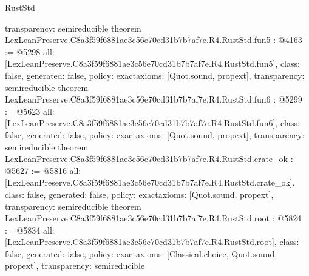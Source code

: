 \begin{lexlean}{RustStd}
\begin{coremodule}
{  transparency: semireducible
}
theorem LexLeanPreserve.C8a3f59f6881ae3c56e70cd31b7b7af7e.R4.RustStd.fun5 : @4163 := @5298 {
  all: [LexLeanPreserve.C8a3f59f6881ae3c56e70cd31b7b7af7e.R4.RustStd.fun5],
  class: false,
  generated: false,
  policy: exact{axioms: [Quot.sound, propext]},
  transparency: semireducible
}
theorem LexLeanPreserve.C8a3f59f6881ae3c56e70cd31b7b7af7e.R4.RustStd.fun6 : @5299 := @5623 {
  all: [LexLeanPreserve.C8a3f59f6881ae3c56e70cd31b7b7af7e.R4.RustStd.fun6],
  class: false,
  generated: false,
  policy: exact{axioms: [Quot.sound, propext]},
  transparency: semireducible
}
theorem LexLeanPreserve.C8a3f59f6881ae3c56e70cd31b7b7af7e.R4.RustStd.crate_ok : @5627 := @5816 {
  all: [LexLeanPreserve.C8a3f59f6881ae3c56e70cd31b7b7af7e.R4.RustStd.crate_ok],
  class: false,
  generated: false,
  policy: exact{axioms: [Quot.sound, propext]},
  transparency: semireducible
}
theorem LexLeanPreserve.C8a3f59f6881ae3c56e70cd31b7b7af7e.R4.RustStd.root : @5824 := @5834 {
  all: [LexLeanPreserve.C8a3f59f6881ae3c56e70cd31b7b7af7e.R4.RustStd.root],
  class: false,
  generated: false,
  policy: exact{axioms: [Classical.choice, Quot.sound, propext]},
  transparency: semireducible
}


\end{coremodule}
\end{lexlean}
